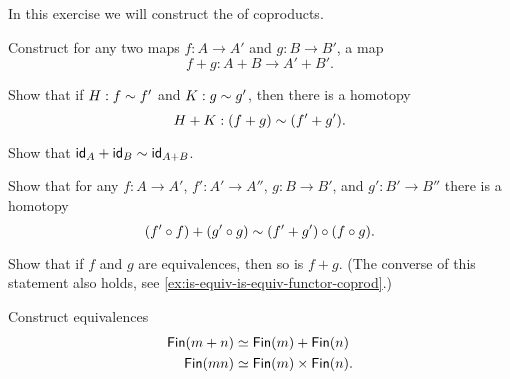 \begin{exercises}
\begin{subexenum}
  \end{subexenum}
\item \label{ex:coproduct_functor}In this exercise we will construct the  of coproducts.
  \begin{subexenum}
  \item Construct for any two maps $f:A \to A'$ and $g:B \to B'$, a map
    \begin{equation*}
      f+g:A+B \to A'+B'.
    \end{equation*}
  \item Show that if $H:f\htpy f'$ and $K:g\htpy g'$, then there is a homotopy
    \begin{equation*}
      H+K:(f+g)\htpy (f'+g').
    \end{equation*}
  \item Show that $\idfunc[A]+\idfunc[B]\htpy \idfunc[A+B]$.
  \item Show that for any $f:A\to A'$, $f':A'\to A''$, $g:B\to B'$, and $g':B'\to B''$ there is a homotopy
    \begin{equation*}
      (f'\circ f)+(g'\circ g) \htpy (f'+g')\circ (f\circ g).
    \end{equation*}
  \item \label{ex:coproduct_functor_equivalence}Show that if $f$ and $g$ are equivalences, then so is $f+g$. (The converse of this statement also holds, see \cref{ex:is-equiv-is-equiv-functor-coprod}.)
  \end{subexenum}
\item Construct equivalences
  \begin{align*}
    \Fin(m+n) & \simeq \Fin(m)+\Fin(n) \\
    \Fin(mn) & \simeq \Fin(m)\times\Fin(n).
  \end{align*}
\end{exercises}
